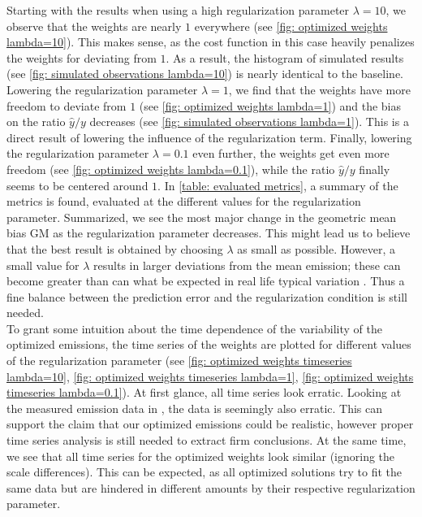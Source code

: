 \documentclass{article}
\begin{document}
Starting with the results when using a high regularization parameter $\lambda=10$, we observe that the weights are nearly $1$ everywhere (see \cref{fig: optimized weights lambda=10}). This makes sense, as the cost function in this case heavily penalizes the weights for deviating from $1$. As a result, the histogram of simulated results (see \cref{fig: simulated observations lambda=10}) is nearly identical to the baseline. Lowering the regularization parameter $\lambda=1$, we find that the weights have more freedom to deviate from $1$ (see \cref{fig: optimized weights lambda=1}) and the bias on the ratio $\hat{y}/y$ decreases (see \cref{fig: simulated observations lambda=1}). This is a direct result of lowering the influence of the regularization term. Finally, lowering the regularization parameter $\lambda=0.1$ even further, the weights get even more freedom (see \cref{fig: optimized weights lambda=0.1}), while the ratio $\hat{y}/y$ finally seems to be centered around $1$. In \cref{table: evaluated metrics}, a summary of the metrics is found, evaluated at the different values for the regularization parameter. Summarized, we see the most major change in the geometric mean bias GM as the regularization parameter decreases. This might lead us to believe that the best result is obtained by choosing $\lambda$ as small as possible. However, a small value for $\lambda$ results in larger deviations from the mean emission; these can become greater than can what be expected in real life typical variation \cite{Ringbom2021,DeMeutter2016}. Thus a fine balance between the prediction error and the regularization condition is still needed.\\

To grant some intuition about the time dependence of the variability of the optimized emissions, the time series of the weights are plotted for different values of the regularization parameter (see \cref{fig: optimized weights timeseries lambda=10}, \cref{fig: optimized weights timeseries lambda=1}, \cref{fig: optimized weights timeseries lambda=0.1}). At first glance, all time series look erratic. Looking at the measured emission data in \cite{Ringbom2021}, the data is seemingly also erratic. This can support the claim that our optimized emissions could be realistic, however proper time series analysis is still needed to extract firm conclusions. At the same time, we see that all time series for the optimized weights look similar (ignoring the scale differences). This can be expected, as all optimized solutions try to fit the same data but are hindered in different amounts by their respective regularization parameter.
\end{document}

